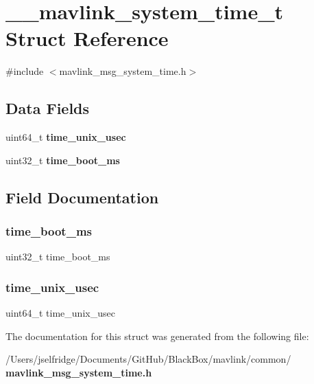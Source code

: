 \section{\+\_\+\+\_\+mavlink\+\_\+system\+\_\+time\+\_\+t Struct Reference}
\label{struct____mavlink__system__time__t}


{\ttfamily \#include $<$mavlink\+\_\+msg\+\_\+system\+\_\+time.\+h$>$}

\subsection*{Data Fields}
\begin{DoxyCompactItemize}
\item 
uint64\+\_\+t \textbf{ time\+\_\+unix\+\_\+usec}
\item 
uint32\+\_\+t \textbf{ time\+\_\+boot\+\_\+ms}
\end{DoxyCompactItemize}


\subsection{Field Documentation}
\mbox{\label{struct____mavlink__system__time__t_ad4e96ee46e36270d1ab66060e46f8c79}} 
\subsubsection{time\+\_\+boot\+\_\+ms}
{\footnotesize\ttfamily uint32\+\_\+t time\+\_\+boot\+\_\+ms}

\mbox{\label{struct____mavlink__system__time__t_af3e0ccd30692873c9d3c6b908a09ef80}} 
\subsubsection{time\+\_\+unix\+\_\+usec}
{\footnotesize\ttfamily uint64\+\_\+t time\+\_\+unix\+\_\+usec}



The documentation for this struct was generated from the following file\+:\begin{DoxyCompactItemize}
\item 
/\+Users/jselfridge/\+Documents/\+Git\+Hub/\+Black\+Box/mavlink/common/\textbf{ mavlink\+\_\+msg\+\_\+system\+\_\+time.\+h}\end{DoxyCompactItemize}
